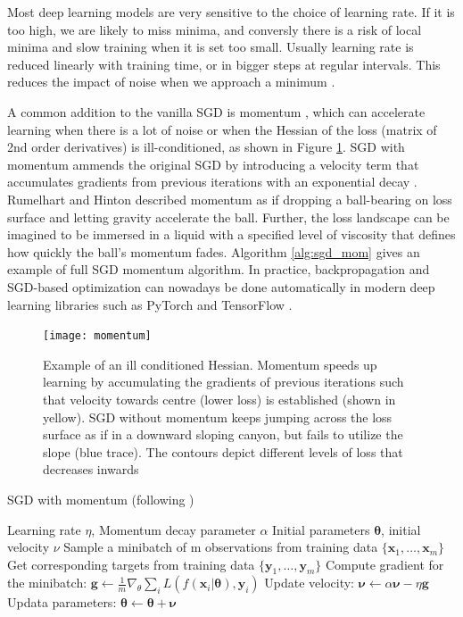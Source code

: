 \documentclass[12pt]{report}
\begin{document}
Most deep learning models are very sensitive to the choice of learning rate. If it is too high, we are likely to miss minima, and conversly there is a risk of local minima and slow training when it is set too small. Usually learning rate is reduced linearly with training time, or in bigger steps at regular intervals. This reduces the impact of noise when we approach a minimum \cite{Goodfellow2016}.

A common addition to the vanilla SGD is momentum \cite{Rumelhart1985}, which can accelerate learning when there is a lot of noise or when the Hessian of the loss (matrix of 2nd order derivatives) is ill-conditioned, as shown in Figure \ref{fig:momentum}. SGD with momentum ammends the original SGD by introducing a velocity term that accumulates gradients from previous iterations with an exponential decay \cite{Goodfellow2016}. Rumelhart and Hinton \cite{Rumelhart1985} described momentum as if dropping a ball-bearing on loss surface and letting gravity accelerate the ball. Further, the loss landscape can be imagined to be immersed in a liquid with a specified level of viscosity that defines how quickly the ball's momentum fades. Algorithm \ref{alg:sgd_mom} gives an example of full SGD momentum algorithm. In practice, backpropagation and SGD-based optimization can nowadays be done automatically in modern deep learning libraries such as PyTorch \cite{Paszke2017} and TensorFlow \cite{Abadi2015}. 

\begin{figure}
  \centering
	\texttt{[image: momentum]}
	\caption{Example of an ill conditioned Hessian. Momentum speeds up learning by accumulating the gradients of previous iterations such that velocity towards centre (lower loss) is established (shown in yellow). SGD without momentum keeps jumping across the loss surface as if in a downward sloping canyon, but fails to utilize the slope (blue trace). The contours depict different levels of loss that decreases inwards}
	\label{fig:momentum}
\end{figure}

\begin{algorithm}
  \caption{SGD with momentum (following \cite{Goodfellow2016})} \label{alg:sgd_mom}
\begin{algorithmic}
  \Require Learning rate $\eta$, Momentum decay parameter $\alpha$
  \Require Initial parameters $\pmb{\theta}$, initial velocity $\nu$
  \State Sample a minibatch of m observations from training data $\{\mathbf{x}_1, \dots, \mathbf{x}_m \}$
  \State Get corresponding targets from training data $\{\mathbf{y}_1, \dots, \mathbf{y}_m \}$ 
  \State Compute gradient for the minibatch: $\mathbf{g} \leftarrow \frac{1}{m} \nabla_{\theta}\sum_i L(f(\mathbf{x}_i| \pmb{\theta}), \mathbf{y}_i)$
  \State Update velocity: $\pmb{\nu} \leftarrow \alpha \pmb{\nu} - \eta\mathbf{g}$
  \State Updata parameters: $\pmb{\theta} \leftarrow \pmb{\theta} + \pmb{\nu}$
  \EndWhile
\end{algorithmic}
\end{algorithm}
\end{document}

